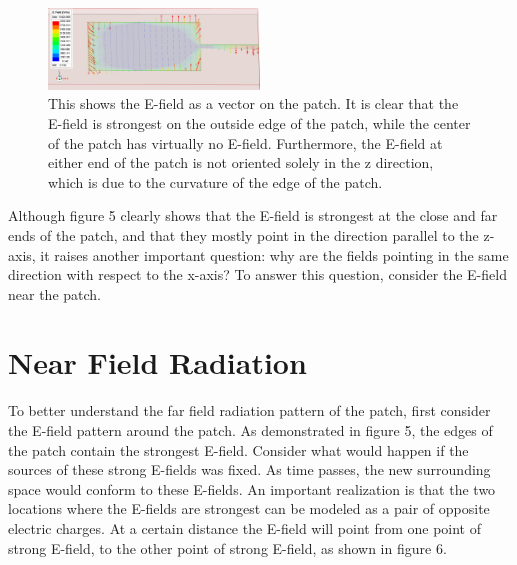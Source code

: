 \documentclass[12pt]{article}
\begin{document}
\begin{figure}[h]
    \centering
    \includegraphics[width=0.5\textwidth]{basic-patch-antenna-VecE-onPatch-t0.png}
    \caption{This shows the E-field as a vector on the patch. It is clear that the E-field is strongest on the outside edge of the patch, while the center of the patch has virtually no E-field. Furthermore, the E-field at either end of the patch is not oriented solely in the z direction, which is due to the curvature of the edge of the patch.}
\end{figure}

Although figure 5 clearly shows that the E-field is strongest at the close and far ends of the patch, and that they mostly point in the direction parallel to the z-axis, it raises another important question: why are the fields pointing in the same direction with respect to the x-axis? To answer this question, consider the E-field near the patch.  

\section{Near Field Radiation}

To better understand the far field radiation pattern of the patch, first consider the E-field pattern around the patch. As demonstrated in figure 5, the edges of the patch contain the strongest E-field. Consider what would happen if the sources of these strong E-fields was fixed. As time passes, the new surrounding space would conform to these E-fields. An important realization is that the two locations where the E-fields are strongest can be modeled as a pair of opposite electric charges. At a certain distance the E-field will point from one point of strong E-field, to the other point of strong E-field, as shown in figure 6.
\end{document}
